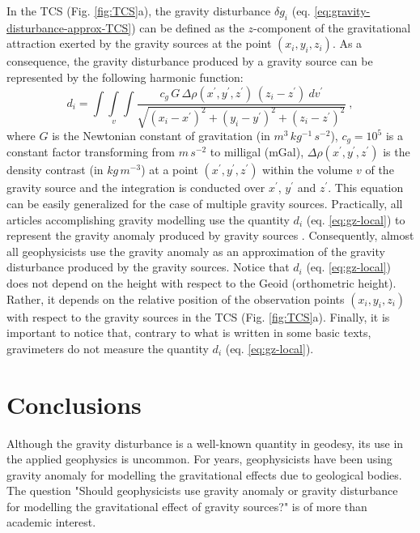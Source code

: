 \documentclass[extra]{gji}
\begin{document}
In the TCS (Fig. \ref{fig:TCS}a),
the gravity disturbance $\delta g_{i}$ (eq. \ref{eq:gravity-disturbance-approx-TCS})
can be defined as the $z$-component of the gravitational attraction exerted by
the gravity sources at the point $(x_{i}, y_{i}, z_{i})$.
As a consequence, the gravity disturbance produced by
a gravity source can be represented by the following harmonic function:
\begin{equation}
d_{i} = \int\int\limits_{v}\int 
\frac{c_{g} \, G \, \Delta\rho(x^{\prime}, y^{\prime}, z^{\prime}) 
\, (z_{i} - z^{\prime}) \: dv^{\prime}}
{\sqrt{(x_{i} - x^{\prime})^{2} + 
(y_{i} - y^{\prime})^{2} + (z_{i} - z^{\prime})^{2}}} \: ,
\label{eq:gz-local}
\end{equation}
where $G$ is the Newtonian constant of gravitation (in $m^{3} \, kg^{-1} \, s^{-2}$),
$c_{g} = 10^{5}$ is a constant factor transforming from $m \, s^{-2}$ 
to milligal (mGal), $\Delta\rho(x^{\prime}, y^{\prime}, z^{\prime})$
is the density contrast (in $kg \, m^{-3}$) at a point 
$(x^{\prime}, y^{\prime}, z^{\prime})$ within 
the volume $v$ of the gravity source and the integration is conducted 
over $x^{\prime}$, $y^{\prime}$ and $z^{\prime}$.
This equation can be easily generalized for the case
of multiple gravity sources.
Practically, all articles accomplishing gravity modelling
use the quantity $d_{i}$ (eq. \ref{eq:gz-local})
to represent the gravity anomaly produced by 
gravity sources \citep[e.g.,][]{blakely1996}. 
Consequently, almost all geophysicists use the gravity
anomaly as an approximation of the gravity disturbance
produced by the gravity sources. Notice that $d_{i}$ 
(eq. \ref{eq:gz-local}) does not depend on the
height with respect to the Geoid (orthometric height). 
Rather, it depends on the relative position 
of the observation points $(x_{i}, y_{i}, z_{i})$ with respect to
the gravity sources in the TCS (Fig. \ref{fig:TCS}a).
Finally, it is important to notice that, contrary to what 
is written in some basic texts, gravimeters do not measure 
the quantity $d_{i}$ (eq. \ref{eq:gz-local}).


\section{Conclusions}

Although the gravity disturbance is a well-known quantity in geodesy,
its use in the applied geophysics is uncommon. 
For years, geophysicists have been using gravity anomaly for modelling
the gravitational effects due to geological bodies.
The question "Should geophysicists use gravity anomaly or gravity
disturbance for modelling the gravitational effect of gravity sources?"
is of more than academic interest.
\end{document}
